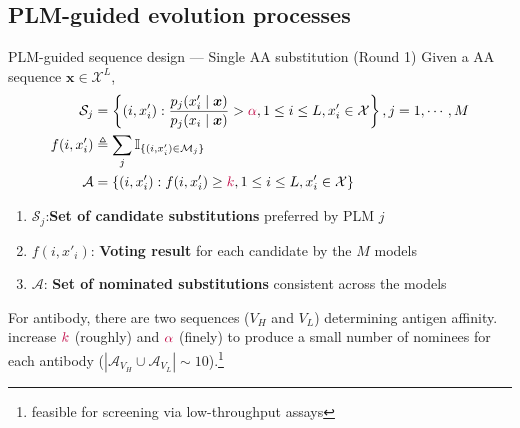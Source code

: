 \documentclass[10pt]{beamer}
\begin{document}

\subsection{PLM-guided evolution processes}

\begin{frame}{PLM-guided sequence design \normalsize --- Single AA substitution (Round 1)}
    Given a AA sequence $\bm{x}\in\mathcal{X}^L$, 
    {\footnotesize\begin{align}
        \mathcal{S}_j & =\left\{(i,x_i'):\frac{p_j(x_i'\mid\bm{x})}{p_j(x_i\mid\bm{x})}>{\color{purple}\alpha},1\leq i\leq L,x_i'\in \mathcal{X}\right\}, j=1,\cdots,M \\
        f(i,x'_i) & \triangleq \sum_{j} \mathbb{I}_{\{(i,x'_i)\in\mathcal{M}_j\}} \\
        \mathcal{A} & = \left\{(i,x'_i):f(i,x'_i)\geq {\color{purple}k}, 1\leq i\leq L,x'_i\in\mathcal{X}\right\}
    \end{align}}
    \begin{enumerate}\small
        \item $\mathcal{S}_j$:\textbf{Set of candidate substitutions} preferred by PLM $j$
        \item $f(i,x'_i)$: \textbf{Voting result} for each candidate by the $M$ models
        \item $\mathcal{A}$: \textbf{Set of nominated substitutions} consistent across the models
    \end{enumerate}
    \medskip
    For antibody, there are two sequences ($V_H$ and $V_L$) determining antigen affinity.
    increase ${\color{purple}k}$ (roughly) and ${\color{purple}\alpha}$ (finely) to produce a small number of nominees 
    for each antibody ($|\mathcal{A}_{V_H}\cup \mathcal{A}_{V_L}|\sim 10$).\footnote{feasible for screening via low-throughput assays}
\end{frame}
\end{document}

